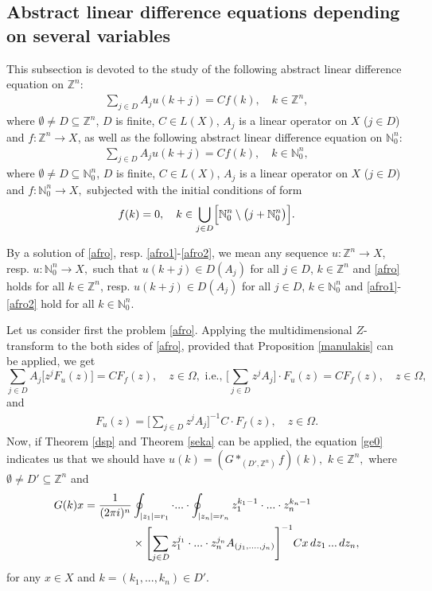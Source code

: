 \documentclass{amsart}
\theoremstyle{definition}
\theoremstyle{remark}
\numberwithin{equation}{section}
\begin{document}
\subsection{Abstract linear difference equations depending on several variables}\label{subs2}

This subsection is devoted to the study of the following abstract linear difference equation on ${\mathbb Z}^{n}:$
\begin{align}\label{afro}
\sum_{j\in D}A_{j}u(k+j)=Cf(k),\quad k\in {\mathbb Z}^{n},
\end{align}
where $\emptyset \neq D\subseteq {\mathbb Z}^{n}$, $D$ is finite, $C\in L(X)$, $A_{j}$ is a linear operator on $X$ ($j\in D$) and $f: {\mathbb Z}^{n} \rightarrow X$, as well as the following abstract linear difference equation on ${\mathbb N}_{0}^{n}:$
\begin{align}\label{afro1}
\sum_{j\in D}A_{j}u(k+j)=Cf(k),\quad k\in {\mathbb N}_{0}^{n},
\end{align}
where $\emptyset \neq D\subseteq {\mathbb N}_{0}^{n}$, $D$ is finite, $C\in L(X)$, $A_{j}$ is a linear operator on $X$ ($j\in D$)  and $f: {\mathbb N}_{0}^{n} \rightarrow X,$ subjected with the initial conditions of form 
\begin{align}\label{afro2}
f(k)=0,\quad k\in \bigcup_{j\in D}\Bigl[{\mathbb N}_{0}^{n} \setminus \bigl(j+{\mathbb N}_{0}^{n}\bigr) \Bigr].
\end{align}

By a solution of \eqref{afro}, resp. \eqref{afro1}-\eqref{afro2}, we mean any sequence $u : {\mathbb Z}^{n} \rightarrow X$, resp. $u : {\mathbb N}_{0}^{n} \rightarrow X,$ such that
$u(k+j)\in D(A_{j})$ for all $j\in D$, $k\in {\mathbb Z}^{n}$ and \eqref{afro} holds for all $k\in {\mathbb Z}^{n}$, resp. 
$u(k+j)\in D(A_{j})$ for all $j\in D$, $k\in {\mathbb N}_{0}^{n}$ and \eqref{afro1}-\eqref{afro2} hold for all $k\in {\mathbb N}_{0}^{n}.$

Let us consider first the problem \eqref{afro}. Applying the multidimensional $Z$-transform to the both sides of \eqref{afro}, provided that Proposition \ref{manulakis} can be applied, we get 
$$
\sum_{j\in D}A_{j}\bigl[ z^{j} F_{u}(z)\bigr]=CF_{f}(z),\quad z\in \Omega ,\mbox{ i.e., }\Biggl[\sum_{j\in D}z^{j}A_{j}\Biggr] \cdot F_{u}(z)=CF_{f}(z),\quad z\in \Omega ,
$$
and
\begin{align}\label{ge0}
F_{u}(z)=\Biggl[\sum_{j\in D}z^{j}A_{j}\Biggr]^{-1}C \cdot F_{f}(z),\quad z\in \Omega .
\end{align}
Now, if Theorem \ref{dsp} and Theorem \ref{seka} can be applied, the equation \eqref{ge0} indicates us that we should have $u(k)= (G\ast_{(D',{\mathbb Z}^{n})} f)(k),$ $k\in {\mathbb Z}^{n},$ where $\emptyset \neq D' \subseteq {\mathbb Z}^{n}$ and
\begin{align}\notag
G(k)x=\frac{1}{(2\pi i)^{n}}&\oint_{|z_{1}|=r_{1}}\cdot ... \cdot \oint_{|z_{n}|=r_{n}}z_{1}^{k_{1}-1}\cdot ... \cdot z_{n}^{k_{n}-1}
\\\label{ge} & \times
\Biggl[\sum_{j\in D}z_{1}^{j_{1}}\cdot ... \cdot z_{n}^{j_{n}}A_{(j_{1},....,j_{n})}\Biggr]^{-1}Cx\, dz_{1}\, ...\, dz_{n},
\end{align}
for any $x\in X$ and $k=(k_{1},...,k_{n})\in D'.$  
\end{document}
